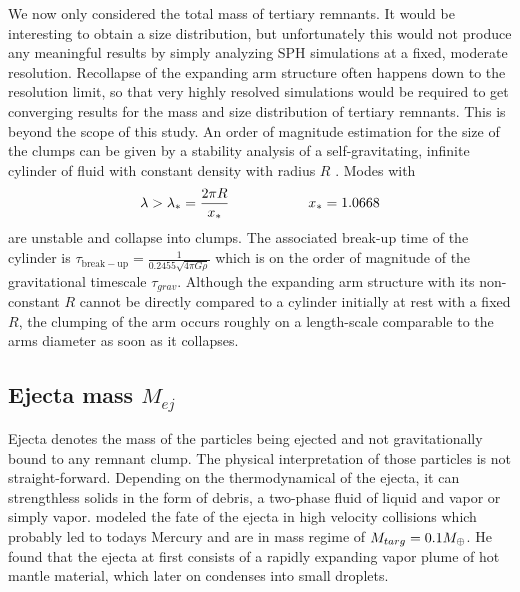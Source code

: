 We now only considered the total mass of tertiary remnants. It would be interesting to obtain a size distribution, but unfortunately this would not produce any meaningful results by simply analyzing SPH simulations at a fixed, moderate resolution. Recollapse of the expanding arm structure often happens down to the resolution limit, so that very highly resolved simulations would be required to get converging results for the mass and size distribution of tertiary remnants. This is beyond the scope of this study. An order of magnitude estimation for the size of the clumps can be given by a stability analysis of a self-gravitating, infinite cylinder of fluid with constant density with radius $R$ \citep{1961Chandrasekhar.C}. Modes with
\begin{align}
\lambda > \lambda_{*} = \frac{2 \pi R}{x_*} \hspace{2.0cm} x_* = 1.0668
\end{align} 
are unstable and collapse into clumps. The associated break-up time of the cylinder is $\tau_{\mathrm{break-up}} = \frac{1}{0.2455 \sqrt{4 \pi G \rho} }$ which is on the order of magnitude of the gravitational timescale $\tau_{grav}$. Although the expanding arm structure with its non-constant $R$ cannot be directly compared to a cylinder initially at rest with a fixed $R$, the clumping of the arm occurs roughly on a length-scale comparable to the arms diameter as soon as it collapses.

\subsection{Ejecta mass $M_{ej}$}
Ejecta denotes the mass of the particles being ejected and not gravitationally bound to any remnant clump. The physical interpretation of those particles is not straight-forward. Depending on the thermodynamical of the ejecta, it can strengthless solids in the form of debris, a two-phase fluid of liquid and vapor or simply vapor. \cite{Anic:2006p99} modeled the fate of the ejecta in high velocity collisions which probably led to todays Mercury and are in mass regime of $M_{targ} = 0.1 M_{\oplus}$. He found that the ejecta at first consists of a rapidly expanding vapor plume of hot mantle material, which later on condenses into small droplets. 

